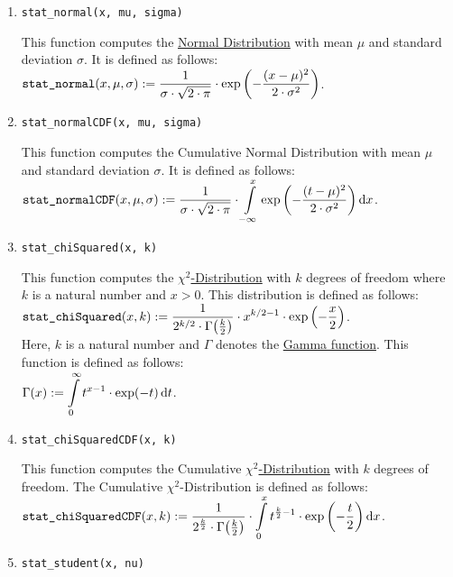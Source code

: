	\begin{enumerate}
		\item \texttt{stat\_normal(x, mu, sigma)}

			This function computes the \href{https://en.wikipedia.org/wiki/Normal_distribution}{Normal Distribution} with mean $\mu$ and standard deviation
			$\sigma$.  It is defined as follows:
			\\[0.2cm]
			\hspace*{1.3cm}
			$\displaystyle \texttt{stat\_normal}(x, \mu, \sigma) :=
			\frac{1}{\sigma \cdot \sqrt{2 \cdot \pi}} \cdot \exp\left(-\frac{(x-\mu)^2}{2 \cdot \sigma^2}\right)
			$.
		\item \texttt{stat\_normalCDF(x, mu, sigma)}

			This function computes the Cumulative Normal Distribution with mean $\mu$ and standard deviation
			$\sigma$.  It is defined as follows:
			\\[0.2cm]
			\hspace*{1.3cm}
			$\displaystyle \texttt{stat\_normalCDF}(x, \mu, \sigma) :=
			\frac{1}{\sigma \cdot \sqrt{2 \cdot \pi}} \cdot 
			\int\limits_{-\infty}^x \exp\left(-\frac{(t-\mu)^2}{2 \cdot \sigma^2}\right) \mathrm{d}x
			$.
		\item \texttt{stat\_chiSquared(x, k)}
		 
			This function computes the
			\href{https://en.wikipedia.org/wiki/Chi-squared_distribution}{$\chi^2$-Distribution}
			with $k$ degrees of freedom where $k$ is a natural number and $x > 0$.
			This distribution is defined as follows:
			\\[0.2cm]
			\hspace*{1.3cm}
			$\displaystyle \texttt{stat\_chiSquared}(x, k) :=
			\frac{1}{2^{k/2} \cdot \Gamma\bigl(\frac{k}{2}\bigr)} \cdot x^{k/2 - 1} \cdot \exp\left(-\frac{x}{2}\right)
			$.
			\\[0.2cm]
			Here, $k$ is a natural number and $\Gamma$ denotes the \href{https://en.wikipedia.org/wiki/Gamma_function}{Gamma function}.
			This function is defined as follows:
			\\[0.2cm]
			\hspace*{1.3cm}
			$\displaystyle \Gamma(x) := \int\limits_0^{\infty} t^{x-1} \cdot \exp(-t)\, \mathrm{d}t$.
		\item \texttt{stat\_chiSquaredCDF(x, k)}
		 
			This function computes the Cumulative
			\href{https://en.wikipedia.org/wiki/Chi-squared_distribution}{$\chi^2$-Distribution}
			with $k$ degrees of freedom.  The Cumulative $\chi^2$-Distribution is defined as follows:
			\\[0.2cm]
			\hspace*{1.3cm}
			$\displaystyle \texttt{stat\_chiSquaredCDF}(x, k) :=
			\frac{1}{2^{\frac{k}{2}} \cdot \Gamma\bigl(\frac{k}{2}\bigr)} \cdot 
			\int\limits_{0}^x t^{\frac{k}{2} - 1} \cdot \exp\left(-\frac{t}{2}\right) \mathrm{d}x
			$.
		\item \texttt{stat\_student(x, nu)}


\end{enumerate}
